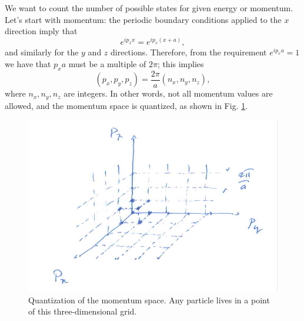 We want to count the number of possible states for given energy or momentum. Let's start with momentum: the periodic boundary conditions applied to the $x$ direction imply that
\begin{equation*}
    e^{ip_xx} = e^{ip_x(x+a)},
\end{equation*}
and similarly for the $y$ and $z$ directions. Therefore, from the requirement $e^{ip_xa} = 1$ we have that $p_xa$ must be a multiple of $2\pi$; this implies
\begin{equation*}
    (p_x,p_y,p_z) = \frac{2\pi}{a}(n_x,n_y,n_z),
\end{equation*}
where $n_x, n_y, n_z$ are integers.
In other words, not all momentum values are allowed, and the momentum space is quantized, as shown in Fig. \ref{quantum-scattering:fig8}.
\begin{figure}[h]
    \includegraphics[scale=0.36]{Figures/qscat6}
    \caption{Quantization of the momentum space. Any particle lives in a point of this three-dimensional grid.}
    \label{quantum-scattering:fig8}
\end{figure}

